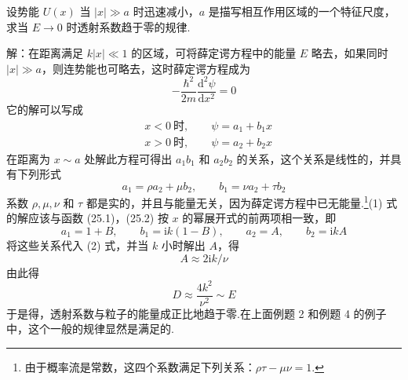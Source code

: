 \begin{xiti}
\quad 设势能 $U(x)$ 当 $|x|\gg a$ 时迅速减小，$a$ 是描写相互作用区域的一个特征尺度，求当 $E\to 0$ 时透射系数趋于零的规律.

解：在距离满足 $k|x|\ll 1$ 的区域，可将薛定谔方程中的能量 $E$ 略去，如果同时 $|x|\gg a$，则连势能也可略去，这时薛定谔方程成为
\begin{equation*}
  -\frac{\hbar^2}{2m}\frac{\mathrm{d}^2\psi}{\mathrm{d}x^2}=0
\end{equation*}
它的解可以写成
\begin{equation*}
\begin{aligned}
  &x<0\ \text{时},\qquad \psi=a_1+b_1 x\\
  &x>0\ \text{时},\qquad \psi=a_2+b_2 x
\end{aligned}
\end{equation*}
在距离为 $x\sim a$ 处解此方程可得出 $a_1 b_1$ 和 $a_2 b_2$ 的关系，这个关系是线性的，并具有下列形式
\begin{equation*}
  a_1=\rho a_2+\mu b_2,
  \qquad
  b_1=\nu a_2+\tau b_2
\end{equation*}
系数 $\rho,\mu,\nu$ 和 $\tau$ 都是实的，并且与能量无关，因为薛定谔方程中已无能量.\footnote{由于概率流是常数，这四个系数满足下列关系：$\rho\tau-\mu\nu=1$.}(1) 式的解应该与函数 (25.1)，(25.2) 按 $x$ 的幂展开式的前两项相一致，即
\begin{equation*}
  a_1=1+B,\qquad
  b_1=\mathrm{i}k\left(1-B\right),\qquad
  a_2=A,\qquad
  b_2=\mathrm{i}k A
\end{equation*}
将这些关系代入 (2) 式，并当 $k$ 小时解出 $A$，得
\begin{equation*}
  A\approx 2\mathrm{i}k/\nu
\end{equation*}
由此得
\begin{equation*}
  D\approx\frac{4k^2}{\nu^2}\sim E
\end{equation*}
于是得，透射系数与粒子的能量成正比地趋于零.在上面例题 2 和例题 4 的例子中，这个一般的规律显然是满足的.

\end{xiti}
